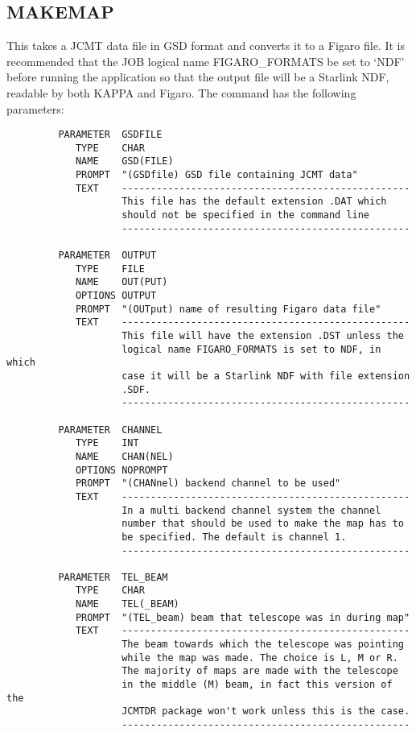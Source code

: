 \subsection{MAKEMAP}

This takes a JCMT data file in GSD format and converts it to a Figaro
file. It is recommended that the JOB logical name FIGARO\_FORMATS be
set  to `NDF' before running the application so that the output file
will be a Starlink NDF, readable by both KAPPA and Figaro. The command
has the following parameters:

\begin{small}
\begin{verbatim}
         PARAMETER  GSDFILE
            TYPE    CHAR
            NAME    GSD(FILE)
            PROMPT  "(GSDfile) GSD file containing JCMT data"
            TEXT    --------------------------------------------------
                    This file has the default extension .DAT which
                    should not be specified in the command line
                    --------------------------------------------------

         PARAMETER  OUTPUT
            TYPE    FILE
            NAME    OUT(PUT)
            OPTIONS OUTPUT
            PROMPT  "(OUTput) name of resulting Figaro data file"
            TEXT    --------------------------------------------------
                    This file will have the extension .DST unless the
                    logical name FIGARO_FORMATS is set to NDF, in which
                    case it will be a Starlink NDF with file extension
                    .SDF.
                    --------------------------------------------------

         PARAMETER  CHANNEL
            TYPE    INT
            NAME    CHAN(NEL)
            OPTIONS NOPROMPT
            PROMPT  "(CHANnel) backend channel to be used"
            TEXT    --------------------------------------------------
                    In a multi backend channel system the channel
                    number that should be used to make the map has to
                    be specified. The default is channel 1.
                    --------------------------------------------------

         PARAMETER  TEL_BEAM
            TYPE    CHAR
            NAME    TEL(_BEAM)
            PROMPT  "(TEL_beam) beam that telescope was in during map"
            TEXT    --------------------------------------------------
                    The beam towards which the telescope was pointing
                    while the map was made. The choice is L, M or R.
                    The majority of maps are made with the telescope
                    in the middle (M) beam, in fact this version of the
                    JCMTDR package won't work unless this is the case.
                    --------------------------------------------------


\end{verbatim}
\end{small}

